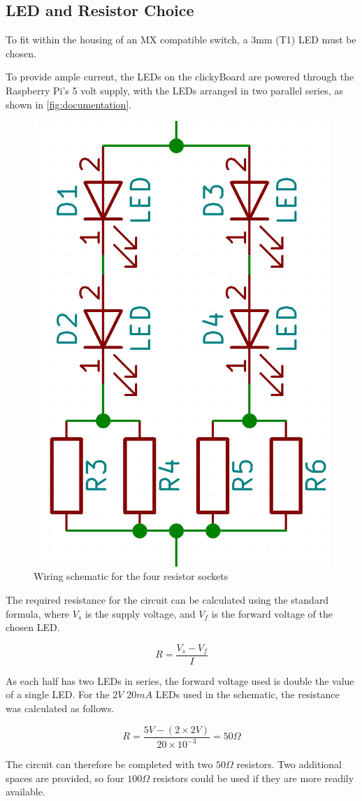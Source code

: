 \documentclass[10pt, a4paper, onesided]{article}
\begin{document}
	
	
	\subsection{LED and Resistor Choice}
	\label{LEDresistors}

	To fit within the housing of an MX compatible switch, a 3mm (T1) LED must be chosen.
	
	To provide ample current, the LEDs on the clickyBoard are powered through the Raspberry Pi's 5 volt supply, with the LEDs arranged in two parallel series, as shown in \autoref*{fig:documentation}.
	
	\begin{figure}[h]
		\centering
		\includegraphics[width=0.25\linewidth]{img/resistor}
		\caption{Wiring schematic for the four resistor sockets}
		\label{fig:documentation}
	\end{figure}
	
	The required resistance for the circuit can be calculated using the standard formula, where $V_s$ is the supply voltage, and $V_f$ is the forward voltage of the chosen LED.
	
	\begin{displaymath}
		R = \frac{V_s - V_f}{I}
	\end{displaymath}
	
	As each half has two LEDs in series, the forward voltage used is double the value of a single LED. For the $2 V$ $20 mA$ LEDs used in the schematic, the resistance was calculated as follows.
	
	\begin{displaymath}
		R = \frac{5 V - (2 \times 2 V)}{20 \times 10^{-3}} = 50 \Omega
	\end{displaymath}
	
	The circuit can therefore be completed with two $50 \Omega$ resistors. Two additional spaces are provided, so four $100 \Omega$ resistors could be used if they are more readily available.
	
\end{document}
